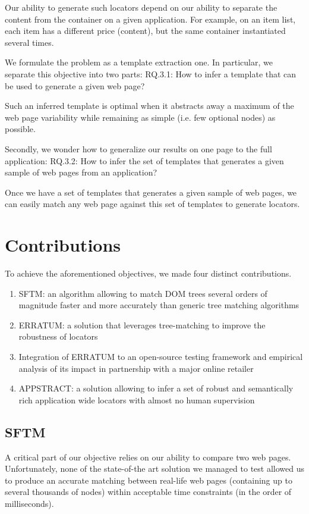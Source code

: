 Our ability to generate such locators depend on our ability to separate the content from the container on a given application. For example, on an item list, each item has a different price (content), but the same container instantiated several times.

We formulate the problem as a template extraction one.
In particular, we separate this objective into two parts:
RQ.3.1: How to infer a template that can be used to generate a given web page?

Such an inferred template is optimal when it abstracts away a maximum of the web page variability while remaining as simple (i.e. few optional nodes) as possible. 

Secondly, we wonder how to generalize our results on one page to the full application:
RQ.3.2: How to infer the set of templates that generates a given sample of web pages from an application?

Once we have a set of templates that generates a given sample of web pages, we can easily match any web page against this set of templates to generate locators.

\section{Contributions}
To achieve the aforementioned objectives, we made four distinct contributions.

\begin{enumerate}
\item SFTM: an algorithm allowing to match DOM trees several orders of magnitude faster and more accurately than generic tree matching algorithms
\item ERRATUM: a solution that leverages tree-matching to improve the robustness of locators
\item Integration of ERRATUM to an open-source testing framework and empirical analysis of its impact in partnership with a major online retailer
\item APPSTRACT: a solution allowing to infer a set of robust and semantically rich application wide locators with almost no human supervision
\end{enumerate}

\subsection{SFTM}
A critical part of our objective relies on our ability to compare two web pages. Unfortunately, none of the state-of-the art solution we managed to test allowed us to produce an accurate matching between real-life web pages (containing up to several thousands of nodes) within acceptable time constraints (in the order of milliseconds).

